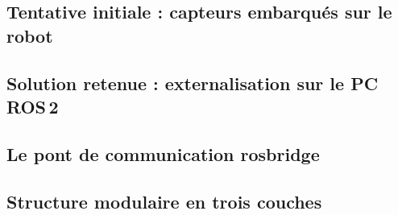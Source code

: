 \documentclass[11pt]{article}
\begin{document}

\subsection{Tentative initiale : capteurs embarqués sur le robot}

\subsection{Solution retenue : externalisation sur le PC ROS\,2}

\subsection{Le pont de communication rosbridge}

\subsection{Structure modulaire en trois couches}
\end{document}
